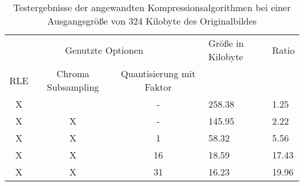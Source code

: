 \begin{table}
\centering
\begin{tabular}{|ccc|l|l|}
	\hline
	\multicolumn{3}{|c|}{Genutzte Optionen}             & Größe in Kilobyte & Ratio \\
	RLE & Chroma Subsampling & Quantisierung mit Faktor &                   &       \\
	\hline
	X   &                    & -                        & 258.38            & 1.25 \\
	X   & X                  & -                        & 145.95            & 2.22 \\
	X   & X                  & 1                        & 58.32             & 5.56 \\
	X   & X                  & 16                       & 18.59             & 17.43 \\
	X   & X                  & 31                       & 16.23             & 19.96 \\
	\hline
\end{tabular}
\caption{Testergebnisse der angewandten Kompressionsalgorithmen bei einer Ausgangsgröße von 324 Kilobyte des Originalbildes}
\label{tab:test}
\end{table}
